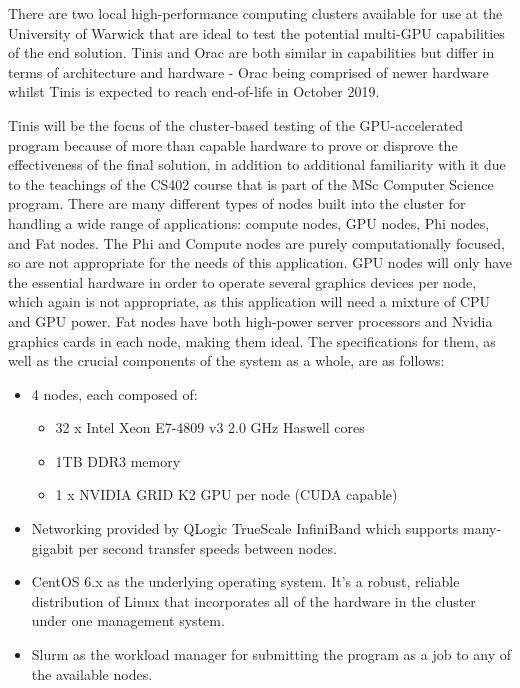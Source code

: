 \documentclass[conference]{IEEEtran}
\begin{document}
There are two local high-performance computing clusters available for use at the University of Warwick that are ideal to test the potential multi-GPU capabilities of the end solution. Tinis and Orac are both similar in capabilities but differ in terms of architecture and hardware - Orac being comprised of newer hardware whilst Tinis is expected to reach end-of-life in October 2019\cite{warwickclusters}.

Tinis will be the focus of the cluster-based testing of the GPU-accelerated program because of more than capable hardware to prove or disprove the effectiveness of the final solution, in addition to additional familiarity with it due to the teachings of the CS402 course that is part of the MSc Computer Science program. There are many different types of nodes built into the cluster for handling a wide range of applications: compute nodes, GPU nodes, Phi nodes, and Fat nodes. The Phi and Compute nodes are purely computationally focused, so are not appropriate for the needs of this application. GPU nodes will only have the essential hardware in order to operate several graphics devices per node, which again is not appropriate, as this application will need a mixture of CPU and GPU power. Fat nodes have both high-power server processors and Nvidia graphics cards in each node, making them ideal. The specifications for them, as well as the crucial components of the system as a whole, are as follows:

\begin{itemize}
    \item 4 nodes, each composed of:
    \begin{itemize}
        \item 32 x Intel Xeon E7-4809 v3 2.0 GHz Haswell cores
        \item 1TB DDR3 memory
        \item 1 x NVIDIA GRID K2 GPU per node (CUDA capable)
    \end{itemize}
    \item Networking provided by QLogic TrueScale InfiniBand which supports many-gigabit per second transfer speeds between nodes.
    \item CentOS 6.x as the underlying operating system. It's a robust, reliable distribution of Linux that incorporates all of the hardware in the cluster under one management system.
    \item Slurm as the workload manager for submitting the program as a job to any of the available nodes.
\end{itemize}
\end{document}
